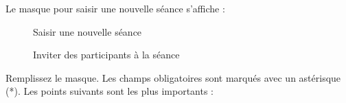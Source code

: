 Le masque pour saisir une nouvelle séance s'affiche :

\begin{figure}[H]
\caption{Saisir une nouvelle séance}
\end{figure}

\begin{figure}[H]
\caption{Inviter des participants à la séance}
\end{figure}

Remplissez le masque. Les champs obligatoires sont marqués avec un astérisque (*). Les points suivants sont les plus importants :

